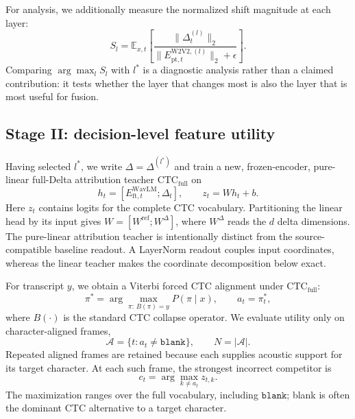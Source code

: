 \documentclass{article}
\newcommand{\blank}{\mathtt{blank}}
\begin{document}
For analysis, we additionally measure the normalized shift magnitude at each layer:
\begin{equation}
S_l=\mathbb{E}_{x,t}\left[
\frac{\lVert\Delta_t^{(l)}\rVert_2}
{\lVert E^{\mathrm{W2V2},(l)}_{\mathrm{pt},t}\rVert_2+\epsilon}
\right].
\label{eq:shift-magnitude}
\end{equation}
Comparing $\arg\max_l S_l$ with $l^*$ is a diagnostic analysis rather than a claimed contribution: it tests whether the layer that changes most is also the layer that is most useful for fusion.

\subsection{Stage II: decision-level feature utility}
\label{sec:feature-utility}

Having selected $l^*$, we write $\Delta=\Delta^{(l^*)}$ and train a new, frozen-encoder, pure-linear full-Delta attribution teacher $\mathrm{CTC}_{\mathrm{full}}$ on
\begin{equation}
h_t=\left[E^{\mathrm{WavLM}}_{\mathrm{ft},t};\Delta_t\right],
\qquad z_t=Wh_t+b.
\label{eq:full-ctc}
\end{equation}
Here $z_t$ contains logits for the complete CTC vocabulary. Partitioning the linear head by its input gives $W=[W^{\mathrm{ref}};W^\Delta]$, where $W^\Delta$ reads the $d$ delta dimensions.
The pure-linear attribution teacher is intentionally distinct from the source-compatible baseline readout. A LayerNorm readout couples input coordinates, whereas the linear teacher makes the coordinate decomposition below exact.


For transcript $y$, we obtain a Viterbi forced CTC alignment under $\mathrm{CTC}_{\mathrm{full}}$:
\begin{equation}
\pi^*=\arg\max_{\pi:\,B(\pi)=y}P(\pi\mid x),
\qquad a_t=\pi_t^*,
\label{eq:viterbi}
\end{equation}
where $B(\cdot)$ is the standard CTC collapse operator. We evaluate utility only on character-aligned frames,
\begin{equation}
\mathcal{A}=\{t:a_t\neq\blank\},\qquad N=|\mathcal{A}|.
\label{eq:active-frames}
\end{equation}
Repeated aligned frames are retained because each supplies acoustic support for its target character. At each such frame, the strongest incorrect competitor is
\begin{equation}
c_t=\arg\max_{k\neq a_t}z_{t,k}.
\label{eq:competitor}
\end{equation}
The maximization ranges over the full vocabulary, including $\blank$; blank is often the dominant CTC alternative to a target character.
\end{document}
